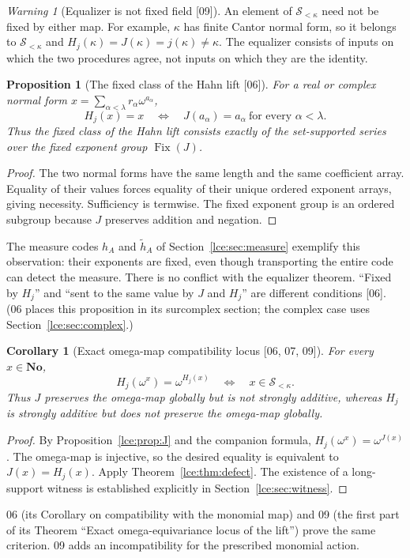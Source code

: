 \documentclass[11pt,letterpaper]{article}
\numberwithin{equation}{section}
\newtheorem{proposition}[theorem]{Proposition}
\newtheorem{corollary}[theorem]{Corollary}
\theoremstyle{definition}
\theoremstyle{remark}
\newcommand{\No}{\mathbf{No}}
\newcommand{\Sk}{\mathscr S_{<\kappa}}
\newcommand{\thref}[1]{Theorem~\ref{#1}}
\newcommand{\prref}[1]{Proposition~\ref{#1}}
\newtheorem{warning}[theorem]{Warning}
\newcommand{\src}[1]{\textup{\textsf{\small[#1]}}}%
\newcommand{\Fix}{\operatorname{Fix}}
\begin{document}
\begin{warning}[Equalizer is not fixed field \src{09}]\label{lce:sg:warn:fixed}
An element of $\Sk$ need not be fixed by either map. For example, $\kappa$
has finite Cantor normal form, so it belongs to $\Sk$ and
$H_j(\kappa)=J(\kappa)=j(\kappa)\ne\kappa$. The equalizer consists of inputs
on which the two procedures agree, not inputs on which they are the
identity.
\end{warning}

\begin{proposition}[The fixed class of the Hahn lift \src{06}]\label{lce:cs:prop:fixed}
For a real or complex normal form $x=\sum_{\alpha<\lambda}r_\alpha\omega^{a_\alpha}$,
\[
 H_j(x)=x\quad\Longleftrightarrow\quad
 J(a_\alpha)=a_\alpha\ \text{for every }\alpha<\lambda.
\]
Thus the fixed class of the Hahn lift consists exactly of the set-supported
series over the fixed exponent group $\Fix(J)$.
\end{proposition}
\begin{proof}
The two normal forms have the same length and the same coefficient array.
Equality of their values forces equality of their unique ordered exponent
arrays, giving necessity. Sufficiency is termwise. The fixed exponent group
is an ordered subgroup because $J$ preserves addition and negation.
\end{proof}
The measure codes $h_A$ and $\tilde h_A$ of Section~\ref{lce:sec:measure}
exemplify this observation: their exponents are fixed, even though
transporting the entire code can detect the measure. There is no conflict
with the equalizer theorem. ``Fixed by $H_j$'' and ``sent to the same value
by $J$ and $H_j$'' are different conditions \src{06}. (06 places this
proposition in its surcomplex section; the complex case uses
Section~\ref{lce:sec:complex}.)

\begin{corollary}[Exact omega-map compatibility locus \src{06, 07, 09}]\label{lce:cor:omegalocus}
For every $x\in\No$,
\[
 H_j(\omega^x)=\omega^{H_j(x)}
   \quad\Longleftrightarrow\quad x\in\Sk.
\]
Thus $J$ preserves the omega-map globally but is not strongly additive,
whereas $H_j$ is strongly additive but does not preserve the omega-map
globally.
\end{corollary}
\begin{proof}
By \prref{lce:prop:J} and the companion formula,
$H_j(\omega^x)=\omega^{J(x)}$. The omega-map is injective, so the desired
equality is equivalent to $J(x)=H_j(x)$. Apply \thref{lce:thm:defect}.
The existence of a long-support witness is established explicitly in
Section~\ref{lce:sec:witness}.
\end{proof}
06 (its Corollary on compatibility with the monomial map) and 09 (the first
part of its Theorem ``Exact omega-equivariance locus of the lift'') prove the
same criterion. 09 adds an incompatibility for the prescribed monomial
action.
\end{document}
